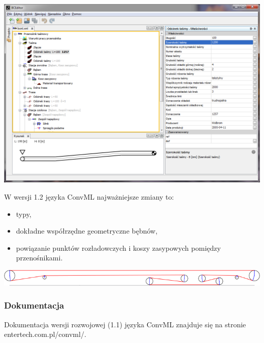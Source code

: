 \documentclass{beamer}
\begin{document}
\begin{frame}
\begin{center}
\includegraphics[width=\textwidth]{beamer/mainWin}
\end{center}
\end{frame}

\begin{frame}
W wersji 1.2 języka ConvML najważniejsze zmiany to:
\begin{itemize}
\item typy,
\item dokładne współrzędne geometryczne bębnów,
\item powiązanie punktów rozładowczych i koszy zasypowych pomiędzy
  przenośnikami.
\end{itemize}

\includegraphics[width=\textwidth]{beamer/bce20}
\end{frame}

\begin{frame}
\frametitle{Dokumentacja} 

Dokumentacja wersji rozwojowej (1.1) języka ConvML znajduje się na stronie
entertech.com.pl/convml/.
\end{frame}
\end{document}
